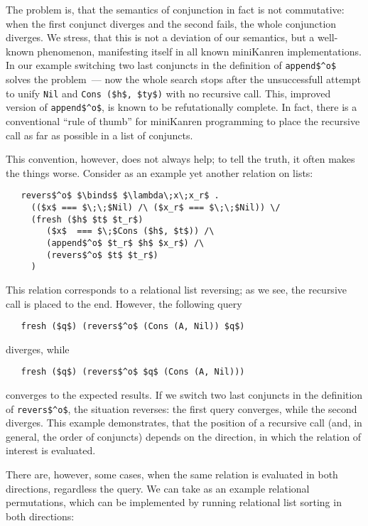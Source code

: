 The problem is, that the semantics of conjunction in fact is not commutative: when the first conjunct diverges and the second fails, the whole
conjunction diverges. We stress, that this is not a deviation of our semantics, but a well-known phenomenon, manifesting itself in all known
miniKanren implementations. In our example switching two last conjuncts in the definition of \lstinline|append$^o$| solves the problem~---
now the whole search stops after the unsuccessfull attempt to unify \lstinline|Nil| and \lstinline|Cons ($h$, $ty$)| with no recursive call.
This, improved version of \lstinline|append$^o$|, is known to be refutationally complete. In fact, there is a conventional ``rule of thumb''
for miniKanren programming to place the recursive call as far as possible in a list of conjuncts. 

This convention, however, does not always help; to tell the truth, it often makes the things worse. Consider 
as an example yet another relation on lists:

\begin{lstlisting}
   revers$^o$ $\binds$ $\lambda\;x\;x_r$ . 
     (($x$ === $\;\;$Nil) /\ ($x_r$ === $\;\;$Nil)) \/
     (fresh ($h$ $t$ $t_r$)
        ($x$  === $\;$Cons ($h$, $t$)) /\
        (append$^o$ $t_r$ $h$ $x_r$) /\
        (revers$^o$ $t$ $t_r$)
     )
\end{lstlisting}

This relation corresponds to a relational list reversing; as we see, the recursive call is placed to
the end. However, the following query

\begin{lstlisting}
   fresh ($q$) (revers$^o$ (Cons (A, Nil)) $q$)
\end{lstlisting}

\noindent diverges, while

\begin{lstlisting}
   fresh ($q$) (revers$^o$ $q$ (Cons (A, Nil)))
\end{lstlisting}

\noindent converges to the expected results. If we switch two last conjuncts in the definition of
\lstinline|revers$^o$|, the situation reverses: the first query converges, while the second diverges. 
This example demonstrates, that the position of a recursive call (and, in general, the order of
conjuncts) depends on the direction, in which the relation of interest is evaluated.

There are, however, some cases, when the same relation is evaluated in both directions, regardless
the query. We can take as an example relational permutations, which can be implemented by running
relational list sorting in both directions:

